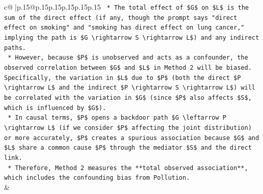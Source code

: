 \documentclass{article}
\begin{document}
{\begin{supertabular}{c@{$\;$}|p{.15\linewidth}@{}p{.15\linewidth}p{.15\linewidth}p{.15\linewidth}p{.15\linewidth}p{.15\linewidth}}
{{{\texttt{    *   The total effect of \$G\$ on \$L\$ is the sum of the direct effect (if any, though the prompt says "direct effect on smoking" and "smoking has direct effect on lung cancer," implying the path is \$G \textbackslash{}rightarrow S \textbackslash{}rightarrow L\$) and any indirect paths.} \\
\texttt{    *   However, because \$P\$ is unobserved and acts as a confounder, the observed correlation between \$G\$ and \$L\$ in Method 2 will be biased. Specifically, the variation in \$L\$ due to \$P\$ (both the direct \$P \textbackslash{}rightarrow L\$ and the indirect \$P \textbackslash{}rightarrow S \textbackslash{}rightarrow L\$) will be correlated with the variation in \$G\$ (since \$P\$ also affects \$S\$, which is influenced by \$G\$).} \\
\texttt{    *   In causal terms, \$P\$ opens a backdoor path \$G \textbackslash{}leftarrow P \textbackslash{}rightarrow L\$ (if we consider \$P\$ affecting the joint distribution) or more accurately, \$P\$ creates a spurious association because \$G\$ and \$L\$ share a common cause \$P\$ through the mediator \$S\$ and the direct link.} \\
\texttt{    *   Therefore, Method 2 measures the **total observed association**, which includes the confounding bias from Pollution.} \\
            }
        }
    }
    & \\ \\


\end{supertabular}}
\end{document}
